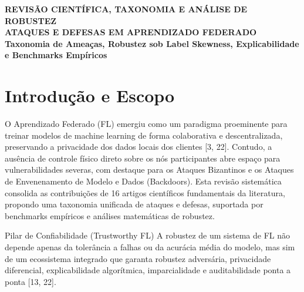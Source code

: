 \documentclass[11pt,a4paper]{article}
\begin{document}
\begin{center}
    \colorbox{primary}{
        \begin{minipage}{\dimexpr\textwidth-2\fboxsep\relax}
            \centering
            \vspace{10pt}
            {\color{white}\fontsize{18}{22}\selectfont\textbf{REVISÃO CIENTÍFICA, TAXONOMIA E ANÁLISE DE ROBUSTEZ}} \\
            \vspace{5pt}
            {\color{white}\fontsize{14}{18}\selectfont\textbf{ATAQUES E DEFESAS EM APRENDIZADO FEDERADO}} \\
            \vspace{5pt}
            {\color{secondary!30}\fontsize{10}{12}\selectfont\textbf{Taxonomia de Ameaças, Robustez sob Label Skewness, Explicabilidade e Benchmarks Empíricos}} \\
            \vspace{10pt}
        \end{minipage}
    }
\end{center}

\vspace{10pt}

\section*{Introdução e Escopo}
O Aprendizado Federado (FL) emergiu como um paradigma proeminente para treinar modelos de machine learning de forma colaborativa e descentralizada, preservando a privacidade dos dados locais dos clientes [3, 22]. Contudo, a ausência de controle físico direto sobre os nós participantes abre espaço para vulnerabilidades severas, com destaque para os Ataques Bizantinos e os Ataques de Envenenamento de Modelo e Dados (Backdoors). Esta revisão sistemática consolida as contribuições de 16 artigos científicos fundamentais da literatura, propondo uma taxonomia unificada de ataques e defesas, suportada por benchmarks empíricos e análises matemáticas de robustez.

\begin{calloutbox}{Pilar de Confiabilidade (Trustworthy FL)}
A robustez de um sistema de FL não depende apenas da tolerância a falhas ou da acurácia média do modelo, mas sim de um ecossistema integrado que garanta robustez adversária, privacidade diferencial, explicabilidade algorítmica, imparcialidade e auditabilidade ponta a ponta [13, 22].
\end{calloutbox}
\end{document}
